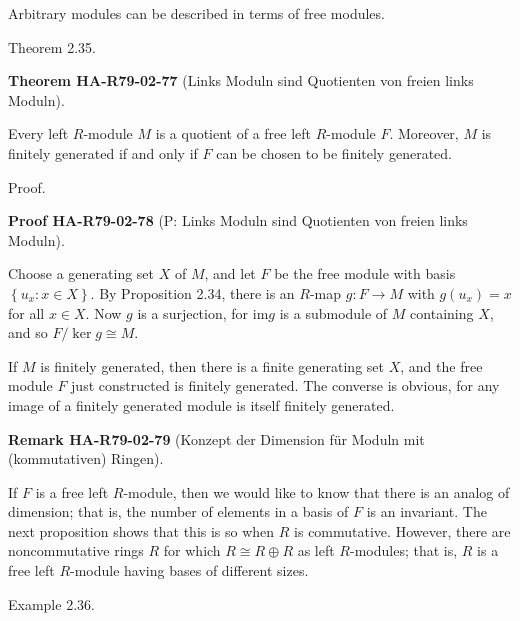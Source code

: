 \documentclass[10pt, letterpaper]{article}
\newcommand{\CustomHeading}[3]{%
  \par\medskip\noindent%
  \textbf{#1 #2} \textnormal{(#3)}.\enskip%
}
\newenvironment{THEO}[2]{\begin{unitbox}\CustomHeading{Theorem}{#1}{#2}}{\end{unitbox}}
\newenvironment{REM}[2]{\begin{unitbox}\CustomHeading{Remark}{#1}{#2}}{\end{unitbox}}
\newenvironment{PROOF}[2]{\begin{unitbox}\CustomHeading{Proof}{#1}{#2}}{\end{unitbox}}
\begin{document}
Arbitrary modules can be described in terms of free modules.



Theorem 2.35. 

\begin{THEO}{HA-R79-02-77}{Links Moduln sind Quotienten von freien links Moduln}
Every left $R$-module $M$ is a quotient of a free left $R$-module $F$. Moreover, $M$ is finitely generated if and only if $F$ can be chosen to be finitely generated.
\end{THEO}

Proof. 

\begin{PROOF}{HA-R79-02-78}{P: Links Moduln sind Quotienten von freien links Moduln}
Choose a generating set $X$ of $M$, and let $F$ be the free module with basis $\left\{u_{x}: x \in X\right\}$. By Proposition 2.34, there is an $R$-map $g: F \rightarrow M$ with $g\left(u_{x}\right)=x$ for all $x \in X$. Now $g$ is a surjection, for $\mathrm{im} g$ is a submodule of $M$ containing $X$, and so $F / \operatorname{ker} g \cong M$.

If $M$ is finitely generated, then there is a finite generating set $X$, and the free module $F$ just constructed is finitely generated. The converse is obvious, for any image of a finitely generated module is itself finitely generated.
\end{PROOF}

\begin{REM}{HA-R79-02-79}{Konzept der Dimension für Moduln mit (kommutativen) Ringen}
If $F$ is a free left $R$-module, then we would like to know that there is an analog of dimension; that is, the number of elements in a basis of $F$ is an invariant. The next proposition shows that this is so when $R$ is commutative. However, there are noncommutative rings $R$ for which $R \cong R \oplus R$ as left $R$-modules; that is, $R$ is a free left $R$-module having bases of different sizes.
\end{REM}


Example 2.36. 
\end{document}
